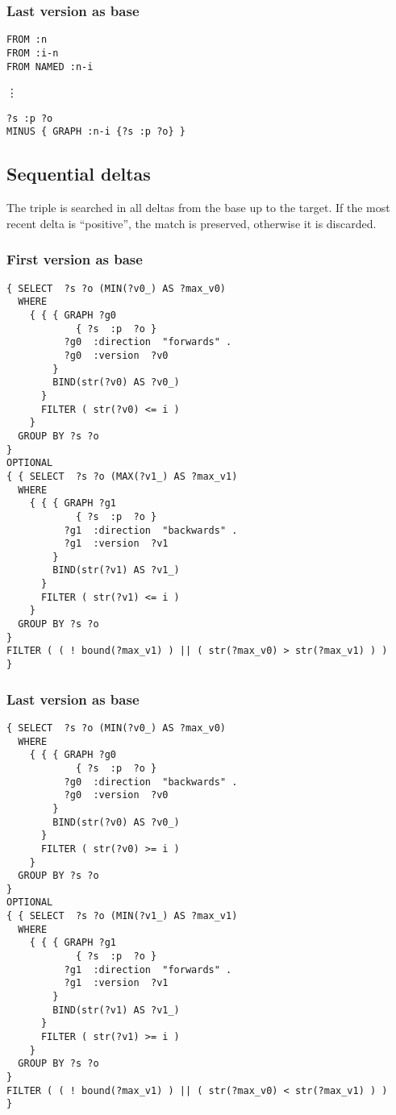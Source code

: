 \subsubsection{Last version as base}
\begin{verbatim}
FROM :n
FROM :i-n
FROM NAMED :n-i
\end{verbatim}
\vdots
\begin{verbatim}
?s :p ?o
MINUS { GRAPH :n-i {?s :p ?o} }
\end{verbatim}

\subsection{Sequential deltas}
The triple is searched in all deltas from the base up to the target. If the most recent delta is ``positive'', the match is preserved, otherwise it is discarded.
\subsubsection{First version as base}
\begin{verbatim}
{ SELECT  ?s ?o (MIN(?v0_) AS ?max_v0)
  WHERE
    { { { GRAPH ?g0
            { ?s  :p  ?o }
          ?g0  :direction  "forwards" .
          ?g0  :version  ?v0
        }
        BIND(str(?v0) AS ?v0_)
      }
      FILTER ( str(?v0) <= i )
    }
  GROUP BY ?s ?o
}
OPTIONAL
{ { SELECT  ?s ?o (MAX(?v1_) AS ?max_v1)
  WHERE
    { { { GRAPH ?g1
            { ?s  :p  ?o }
          ?g1  :direction  "backwards" .
          ?g1  :version  ?v1
        }
        BIND(str(?v1) AS ?v1_)
      }
      FILTER ( str(?v1) <= i )
    }
  GROUP BY ?s ?o
}
FILTER ( ( ! bound(?max_v1) ) || ( str(?max_v0) > str(?max_v1) ) )
}
\end{verbatim}
\subsubsection{Last version as base}
\begin{verbatim}
{ SELECT  ?s ?o (MIN(?v0_) AS ?max_v0)
  WHERE
    { { { GRAPH ?g0
            { ?s  :p  ?o }
          ?g0  :direction  "backwards" .
          ?g0  :version  ?v0
        }
        BIND(str(?v0) AS ?v0_)
      }
      FILTER ( str(?v0) >= i )
    }
  GROUP BY ?s ?o
}
OPTIONAL
{ { SELECT  ?s ?o (MIN(?v1_) AS ?max_v1)
  WHERE
    { { { GRAPH ?g1
            { ?s  :p  ?o }
          ?g1  :direction  "forwards" .
          ?g1  :version  ?v1
        }
        BIND(str(?v1) AS ?v1_)
      }
      FILTER ( str(?v1) >= i )
    }
  GROUP BY ?s ?o
}
FILTER ( ( ! bound(?max_v1) ) || ( str(?max_v0) < str(?max_v1) ) )
}
\end{verbatim}


